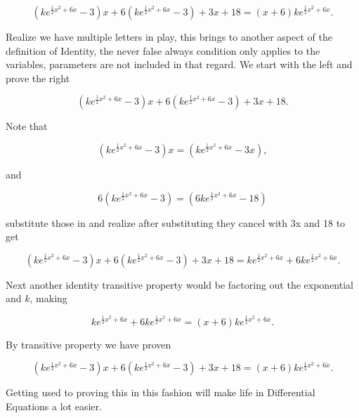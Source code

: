 \documentclass[12pt]{article}
\begin{document}
\begin{equation*}
    \left(ke^{\frac{1}{2}x^2+6x}-3\right)x+6\left(ke^{\frac{1}{2}x^2+6x}-3\right)+3x+18 = (x+6)ke^{\frac{1}{2}x^2+6x}.
\end{equation*}

Realize we have multiple letters in play, this brings to another aspect of the definition of Identity, the never false always condition only applies to the variables, parameters are not included in that regard. We start with the left and prove the right

\begin{equation*}
    \left(ke^{\frac{1}{2}x^2+6x}-3\right)x+6\left(ke^{\frac{1}{2}x^2+6x}-3\right)+3x+18.
\end{equation*}

Note that 

\begin{equation*}
    \left(ke^{\frac{1}{2}x^2+6x}-3\right)x=\left(ke^{\frac{1}{2}x^2+6x}-3x\right),
\end{equation*}

and

\begin{equation*}
    6\left(ke^{\frac{1}{2}x^2+6x}-3\right)=\left(6ke^{\frac{1}{2}x^2+6x}-18\right)
\end{equation*}

substitute those in and realize after substituting they cancel with 3x and 18 to get

\begin{equation*}
    \left(ke^{\frac{1}{2}x^2+6x}-3\right)x+6\left(ke^{\frac{1}{2}x^2+6x}-3\right)+3x+18=ke^{\frac{1}{2}x^2+6x}+6ke^{\frac{1}{2}x^2+6x}.
\end{equation*}

Next another identity transitive property would be factoring out the exponential and $k$, making

\begin{equation*}
    ke^{\frac{1}{2}x^2+6x}+6ke^{\frac{1}{2}x^2+6x}=(x+6)ke^{\frac{1}{2}x^2+6x}.
\end{equation*}

By transitive property we have proven

\begin{equation*}
    \left(ke^{\frac{1}{2}x^2+6x}-3\right)x+6\left(ke^{\frac{1}{2}x^2+6x}-3\right)+3x+18 = (x+6)ke^{\frac{1}{2}x^2+6x}.
\end{equation*}

Getting used to proving this in this fashion will make life in Differential Equations a lot easier.
\end{document}
